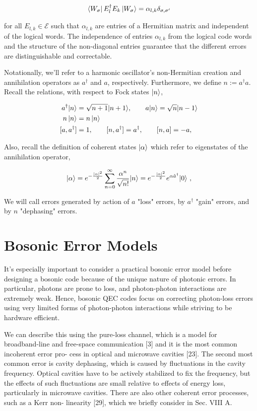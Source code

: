 \documentclass[12]{amsart}
\newcommand\0{\mathbf{0}}
\newcommand\<{\langle}
\renewcommand\>{\rangle}
\begin{document}
\begin{align}
\label{eq:k-l}
\bra{W_\sigma} E_l^\dag E_k \ket{W_\sigma} = \alpha_{l, k} \delta_{\sigma, \sigma'}	
\end{align}

for all $E_{l,k} \in \mathcal{E}$ such that $\alpha_{l,k}$ are entries of a Hermitian matrix and independent of the logical words. The independence of entries $\alpha_{l,k}$ from the logical code words and the structure of the non-diagonal entries guarantee that the different errors are distinguishable and correctable.

Notationally, we'll refer to a harmonic oscillator's non-Hermitian creation and annihilation operators as $a^\dag$ and $a$, respectively. Furthermore, we define $n := a^{\dag }a$. Recall the relations, with respect to Fock states $\ket{n}$,

\begin{align*}
a^{\dagger }|n\rangle &={\sqrt {n+1}}|n+1\rangle, \qquad a|n\rangle={\sqrt {n}}|n-1\rangle \\
n\ket{n} &= n\ket{n} \\
[a,a^{\dag }]&=1, \qquad[n,a^{\dag }]=a^{\dag }, \qquad[n,a]=-a,
\end{align*}

Also, recall the definition of coherent states $\ket{\alpha}$ which refer to eigenstates of the annihilation operator,

$$
|\alpha\rangle =e^{-{|\alpha|^2\over2}}\sum_{n=0}^{\infty}{\alpha^n\over\sqrt{n!}}|n\rangle =e^{-{|\alpha|^2\over2}}e^{\alpha\hat a^\dagger}|0\rangle ~,
$$

We will call errors generated by action of $a$ "loss" errors, by $a^\dag$ "gain" errors, and by $n$ "dephasing" errors. 

\section{Bosonic Error Models}

It's especially important to consider a practical bosonic error model before designing a bosonic code because of the unique nature of photonic errors. In particular, photons are prone to loss, and photon-photon interactions are extremely weak. Hence, bosonic QEC codes focus on correcting photon-loss errors using very limited forms of photon-photon interactions while striving to be hardware efficient\cite{niu2018hardware}. 

We can describe this using the pure-loss channel, which is a model for broadband-line and free-space communication [3] and it is the most common incoherent error pro- cess in optical and microwave cavities [23]. The second most common error is cavity dephasing, which is caused by fluctuations in the cavity frequency. Optical cavities have to be actively stabilized to fix the frequency, but the effects of such fluctuations are small relative to effects of energy loss, particularly in microwave cavities. There are also other coherent error processes, such as a Kerr non- linearity [29], which we briefly consider in Sec. VIII A.
\end{document}
